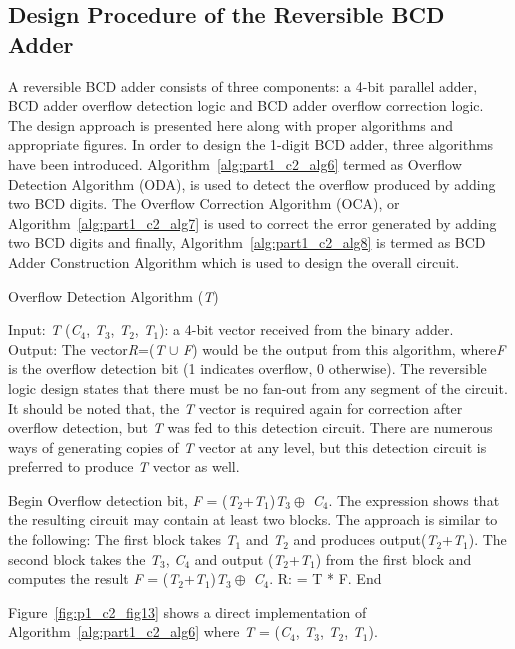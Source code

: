 \subsection{Design Procedure of the Reversible BCD Adder}

A reversible BCD adder consists of three components: a 4-bit parallel adder, BCD adder overflow detection logic and BCD adder overflow correction logic. The design approach is presented here along with proper algorithms and appropriate figures. In order to design the 1-digit BCD adder, three algorithms have been introduced. Algorithm~\ref{alg:part1_c2_alg6} termed as Overflow Detection Algorithm (ODA), is used to detect the overflow produced by adding two BCD digits. The Overflow Correction Algorithm (OCA), or Algorithm~\ref{alg:part1_c2_alg7} is used to correct the error generated by adding two BCD digits and finally, Algorithm~\ref{alg:part1_c2_alg8} is termed as BCD Adder Construction Algorithm which is used to design the overall circuit.


\begin{algorithm}[!tbh]
	\caption{Overflow Detection Algorithm ({\it T})}
	\label{alg:part1_c2_alg6}
	Input: {\it T }({\it C}${}_{4}$, {\it T}${}_{3}$, {\it T}${}_{2}$, {\it T}${}_{1}$): a 4-bit vector received from the binary adder.\\
	Output: The vector{\it R}=({\it T} ${\cup }$ {\it F}) would be the output from this algorithm, where{\it F} is the overflow detection bit (1 indicates overflow, 0 otherwise). The reversible logic design states that there must be no fan-out from any segment of the circuit. It should be noted that, the {\it T }vector is required again for correction after overflow detection, but {\it T }was fed to this detection circuit. There are numerous ways of generating copies of {\it T }vector at any level, but this detection circuit is preferred to produce {\it T }vector as well.
	\begin{algorithmic}[1]
		\STATE Begin
		\STATE Overflow detection bit, {\it F }= ({\it T}${}_{2}$+{\it T}${}_{1}$){\it T}${}_{3}\oplus$ {\it C}${}_{4}$. The expression shows that the resulting circuit may contain at least two blocks. The approach is similar to the following:
		\STATE The first block takes {\it T}${}_{1}$ and {\it T}${}_{2}$ and produces output({\it T}${}_{2}$+{\it T}${}_{1}$).
		\STATE The second block takes the {\it T}${}_{3}$, {\it C}${}_{4}$ and output ({\it T}${}_{2}$+{\it T}${}_{1}$) from the first block and computes the result {\it F } = ({\it T}${}_{2}$+{\it T}${}_{1}$){\it T}${}_{3}\oplus$ {\it C}${}_{4}$.
		 R: = T * F.
		\STATE End
	\end{algorithmic}
\end{algorithm}
\begin{example}\textnormal{
		Figure~\ref{fig:p1_c2_fig13} shows a direct implementation of Algorithm~\ref{alg:part1_c2_alg6} where {\it T }= ({\it C}${}_{4}$, {\it T}${}_{3}$, {\it T}${}_{2}$, {\it T}${}_{1}$).}
	
\end{example}

